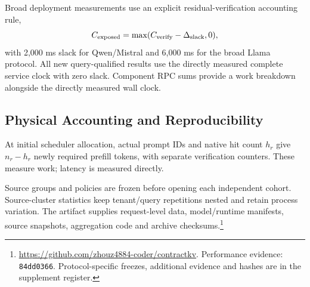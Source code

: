 Broad deployment measurements use an explicit residual-verification accounting rule,
\begin{equation}
 C_{\rm exposed}=\max(C_{\rm verify}-\Delta_{\rm slack},0),
\label{eq:slack}
\end{equation}
with 2,000 ms slack for Qwen/Mistral and 6,000 ms for the broad Llama protocol. All new query-qualified results use the directly measured complete service clock with zero slack. Component RPC sums provide a work breakdown alongside the directly measured wall clock.

\subsection{Physical Accounting and Reproducibility}
At initial scheduler allocation, actual prompt IDs and native hit count $h_r$ give $n_r-h_r$ newly required prefill tokens, with separate verification counters. These measure work; latency is measured directly.

Source groups and policies are frozen before opening each independent cohort. Source-cluster statistics keep tenant/query repetitions nested and retain process variation. The artifact supplies request-level data, model/runtime manifests, source snapshots, aggregation code and archive checksums.\footnote{\url{https://github.com/zhouz4884-coder/contractkv}. Performance evidence: \texttt{84dd0366}. Protocol-specific freezes, additional evidence and hashes are in the supplement register.}
